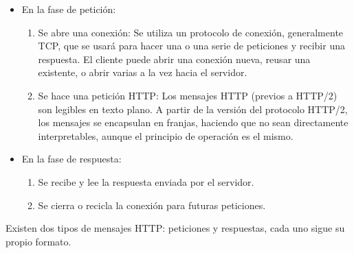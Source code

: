 \begin{itemize}
\item En la fase de petición:
\begin{enumerate}
\item Se abre una conexión: Se utiliza un protocolo de conexión, generalmente TCP, que se usará para hacer una o una serie de peticiones y recibir una respuesta. El cliente puede abrir una conexión nueva, reusar una existente, o abrir varias a la vez hacia el servidor.
\item Se hace una petición HTTP:  Los mensajes HTTP (previos a HTTP/2) son legibles en texto plano. A partir de la versión del protocolo HTTP/2, los mensajes se encapsulan en franjas, haciendo que no sean directamente interpretables, aunque el principio de operación es el mismo.
\end{enumerate}
\item En la fase de respuesta:
\begin{enumerate}
\item Se recibe y lee la respuesta enviada por el servidor.
\item Se cierra o recicla la conexión para futuras peticiones. 
\end{enumerate}
\end{itemize}

Existen dos tipos de mensajes HTTP: peticiones y respuestas, cada uno sigue su propio formato.

